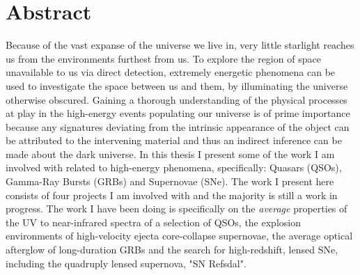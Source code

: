 %
\chapter*{Abstract}
\label{sec:abstract}
\vspace*{-10mm}

Because of the vast expanse of the universe we live in, very little starlight
reaches us from the environments furthest from us. To explore the region of
space unavailable to us via direct detection, extremely energetic phenomena can
be used to investigate the space between us and them, by illuminating the
universe otherwise obscured. Gaining a thorough understanding of the physical
processes at play in the high-energy events populating our universe is of prime
importance because any signatures deviating from the intrinsic appearance of the
object can be attributed to the intervening material and thus an indirect
inference can be made about the dark universe. In this thesis I present some of
the work I am involved with related to high-energy phenomena, specifically:
Quasars (QSOs), Gamma-Ray Bursts (GRBs) and Supernovae (SNe). The work I present
here consists of four projects I am involved with and the majority is still a
work in progress. The work I have been doing is specifically on the
\textit{average} properties of the UV to near-infrared spectra of a selection of
QSOs, the explosion environments of high-velocity ejecta core-collapse
supernovae, the average optical afterglow of long-duration GRBs and the search
for high-redshift, lensed SNe, including the quadruply lensed supernova, "SN
Refsdal".




